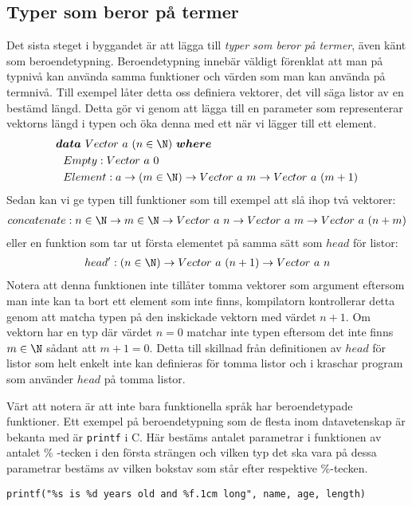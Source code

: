 \subsection{Typer som beror på termer}
Det sista steget i byggandet är att lägga till \emph{typer som beror på
termer}, även känt som beroendetypning. Beroendetypning innebär väldigt
förenklat att man på typnivå kan använda samma funktioner och värden som man
kan använda på termnivå. Till exempel låter detta oss definiera vektorer, det
vill säga listor av en bestämd längd. Detta gör vi genom att lägga till en
parameter som representerar vektorns längd i typen och öka denna med ett när vi
lägger till ett element.
\begin{align*}
  &\boldsymbol{data}\ Vector\ a\ (n \in \N)\ \boldsymbol{where} \\
  &\ \ Empty : Vector\ a\ 0 \\
  &\ \ Element : a \to (m \in \N) \to Vector\ a\ m \to Vector\ a\ (m+1)
\end{align*}
Sedan kan vi ge typen till funktioner som till exempel att slå ihop två
vektorer:
\begin{align*}
  concatenate : n \in \N \to m \in \N \to Vector\ a\ n \to Vector\ a\ m \to Vector\ a\ (n+m)
\end{align*}
eller en funktion som tar ut första elementet på samma sätt som $head$ för
listor:
\begin{align*}
  head' : (n \in \N) \to Vector\ a\ (n+1) \to Vector\ a\ n
\end{align*}
Notera att denna funktionen inte tillåter tomma vektorer som argument eftersom
man inte kan ta bort ett element som inte finns, kompilatorn kontrollerar detta
genom att matcha typen på den inskickade vektorn med värdet $n+1$. Om vektorn
har en typ där värdet $n = 0$ matchar inte typen eftersom det inte finns $m \in
\N$ sådant att $m+1 = 0$. Detta till skillnad från definitionen av $head$ för
listor som helt enkelt inte kan definieras för tomma listor och i \haskell{}
kraschar program som använder $head$ på tomma listor.

Värt att notera är att inte bara funktionella språk har beroendetypade
funktioner. Ett exempel på beroendetypning som de flesta inom datavetenskap är
bekanta med är \texttt{printf} i \textsc{C}. Här bestäms antalet parametrar i
funktionen av antalet \% -tecken i den första strängen och vilken typ det ska
vara på dessa parametrar bestäms av vilken bokstav som står efter respektive
\%-tecken.
\begin{verbatim}
printf("%s is %d years old and %f.1cm long", name, age, length)
\end{verbatim}

